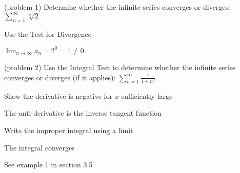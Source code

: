 \documentclass[handout]{ximera}
\begin{document}








\begin{problem}(problem 1)
Determine whether the infinite series converges or diverges: 
$\displaystyle \sum_{n=1}^\infty \sqrt[n] 2$

\begin{hint}
Use the Test for Divergence
\end{hint}

\begin{hint}
$\displaystyle \lim_{n \to \infty} a_n = 2^0 = 1 \neq 0$
\end{hint}

\end{problem}

\begin{problem}(problem 2)
Use the Integral Test to determine whether the infinite series converges or diverges (if it applies):
$\displaystyle \sum_{n=1}^\infty \frac{1}{1 + n^2}$.
\begin{hint}
Show the derivative is negative for $x$ sufficiently large
\end{hint}
\begin{hint}
The anti-derivative is the inverse tangent function
\end{hint}
\begin{hint}
Write the improper integral using a limit
\end{hint}
\begin{hint}
The integral converges
\end{hint}
\begin{hint}
See example 1 in section 3.5
\end{hint}

\end{problem}
\end{document}
